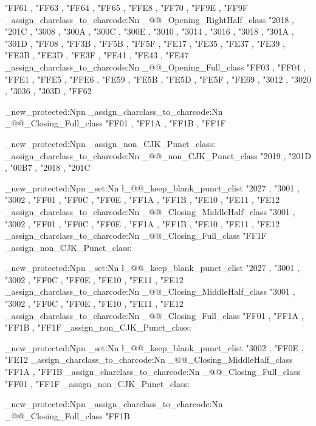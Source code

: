 {{%
        "FF61 , "FF63 , "FF64 , "FF65 , "FFE8 ,
        "FF70 , "FF9E , "FF9F
      }
    \@@_assign_charclass_to_charcode:Nn \g_@@_Opening_RightHalf_class
      {
        "2018 , "201C ,
        "3008 , "300A , "300C , "300E , "3010 ,
        "3014 , "3016 , "3018 , "301A , "301D ,
        "FF08 , "FF3B , "FF5B , "FF5F ,
        "FE17 , "FE35 , "FE37 , "FE39 , "FE3B ,
        "FE3D , "FE3F , "FE41 , "FE43 , "FE47
      }
    \@@_assign_charclass_to_charcode:Nn \g_@@_Opening_Full_class
      {
        "FF03 , "FF04 , "FFE1 , "FFE5 , "FFE6 ,
        "FE59 , "FE5B , "FE5D , "FE5F , "FE69 ,
        "3012 , "3020 , "3036 , "303D ,
        "FF62
      }
  }
\ChineseSimplifiedH

\cs_new_protected:Npn \ChineseSimplifiedV
  {
    \ChineseSimplifiedH
    \@@_assign_charclass_to_charcode:Nn \g_@@_Closing_Full_class
      {
        "FF01 , "FF1A , "FF1B , "FF1F
      }
  }

\cs_new_protected:Npn \@@_assign_non_CJK_Punct_class:
  {
    \@@_assign_charclass_to_charcode:Nn \g_@@_non_CJK_Punct_class
      {
        "2019 , "201D ,
        "00B7 ,
        "2018 , "201C
      }
  }

\cs_new_protected:Npn \ChineseTraditionalH
  {
    \ChineseSimplifiedH
    \clist_set:Nn \l_@@_keep_blank_punct_clist
      {
        "2027 ,
        "3001 , "3002 , "FF01 , "FF0C , "FF0E ,
        "FF1A , "FF1B ,
        "FE10 , "FE11 , "FE12
      }
    \@@_assign_charclass_to_charcode:Nn \g_@@_Closing_MiddleHalf_class
      {
        "3001 , "3002 , "FF01 , "FF0C , "FF0E ,
        "FF1A , "FF1B ,
        "FE10 , "FE11 , "FE12
      }
    \@@_assign_charclass_to_charcode:Nn \g_@@_Closing_Full_class
      {
        "FF1F
      }
    \@@_assign_non_CJK_Punct_class:
  }

\cs_new_protected:Npn \ChineseTraditionalV
  {
    \ChineseSimplifiedH
    \clist_set:Nn \l_@@_keep_blank_punct_clist
      {
        "2027 ,
        "3001 , "3002 , "FF0C , "FF0E ,
        "FE10 , "FE11 , "FE12
      }
    \@@_assign_charclass_to_charcode:Nn \g_@@_Closing_MiddleHalf_class
      {
        "3001 , "3002 , "FF0C , "FF0E ,
        "FE10 , "FE11 , "FE12
      }
    \@@_assign_charclass_to_charcode:Nn \g_@@_Closing_Full_class
      {
        "FF01 , "FF1A , "FF1B , "FF1F
      }
    \@@_assign_non_CJK_Punct_class:
  }

\cs_new_protected:Npn \JapaneseH
  {
    \ChineseSimplifiedH
    \clist_set:Nn \l_@@_keep_blank_punct_clist
      {
        "3002 , "FF0E , "FE12
      }
    \@@_assign_charclass_to_charcode:Nn \g_@@_Closing_MiddleHalf_class
      {
        "FF1A , "FF1B
      }
    \@@_assign_charclass_to_charcode:Nn \g_@@_Closing_Full_class
      {
        "FF01 , "FF1F
      }
    \@@_assign_non_CJK_Punct_class:
  }

\cs_new_protected:Npn \JapaneseV
  {
    \JapaneseH
    \@@_assign_charclass_to_charcode:Nn \g_@@_Closing_Full_class
      {
        "FF1B
      }
  }

\ExplSyntaxOff
\makeatother